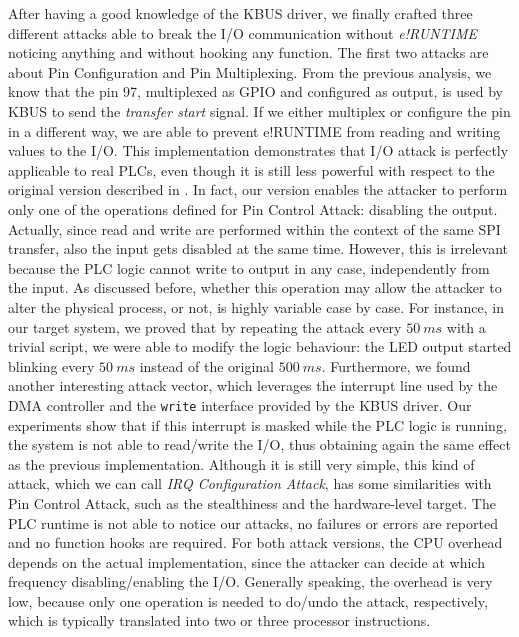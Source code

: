 After having a good knowledge of the KBUS driver, we finally crafted three different attacks able to break the I/O communication without \emph{e!RUNTIME}
noticing anything and without hooking any function. The first two attacks are about Pin Configuration and Pin Multiplexing.
From the previous analysis, we know that the pin 97, multiplexed as GPIO and configured as output, is used by KBUS to send the \emph{transfer start} signal.
If we either multiplex or configure the pin in a different way, we are able to prevent e!RUNTIME from reading and writing values to the I/O.
This implementation demonstrates that I/O attack is perfectly applicable to real PLCs, even though it is still less powerful with respect to the
original version described in . In fact, our version enables the attacker to perform only one of the operations defined for Pin Control Attack:
disabling the output. Actually, since read and write are performed within the context of the same SPI transfer, also the input gets disabled at the same time.
However, this is irrelevant because the PLC logic cannot write to output in any case, independently from the input.
As discussed before, whether this operation may allow the attacker to alter the physical process, or not, is highly variable case by case.
For instance, in our target system, we proved that by repeating the attack every $\SI{50}{ms}$ with a trivial script, we were able to modify the logic behaviour:
the LED output started blinking every $\SI{50}{ms}$ instead of the original $\SI{500}{ms}$.
Furthermore, we found another interesting attack vector, which leverages the interrupt line used by the DMA controller and the \verb|write| interface provided by the KBUS driver.
Our experiments show that if this interrupt is masked while the PLC logic is running, the system is not able to read/write the I/O,
thus obtaining again the same effect as the previous implementation. Although it is still very simple, this kind of attack, which we can call \emph{IRQ Configuration Attack},
has some similarities with Pin Control Attack, such as the stealthiness and the hardware-level target.
The PLC runtime is not able to notice our attacks, no failures or errors are reported and no function hooks are required.
For both attack versions, the CPU overhead depends on the actual implementation, since the attacker can decide at which frequency disabling/enabling the I/O.
Generally speaking, the overhead is very low, because only one operation is needed to do/undo the attack, respectively, which is typically translated into two or three
processor instructions.

